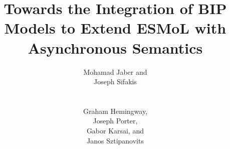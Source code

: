 \title{Towards the Integration of BIP Models to Extend ESMoL with Asynchronous Semantics}

\author{
\alignauthor Mohamad Jaber and \\ Joseph Sifakis \\
     \\
     \\
\alignauthor Graham Hemingway, \\ Joseph Porter, \\ Gabor Karsai, and \\ Janos Sztipanovits \\
     \\
     \\
}

\maketitle